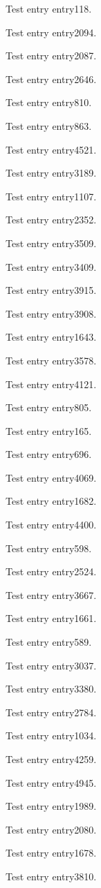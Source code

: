 Test entry \gls{entry118}.

Test entry \gls{entry2094}.

Test entry \gls{entry2087}.

Test entry \gls{entry2646}.

Test entry \gls{entry810}.

Test entry \gls{entry863}.

Test entry \gls{entry4521}.

Test entry \gls{entry3189}.

Test entry \gls{entry1107}.

Test entry \gls{entry2352}.

Test entry \gls{entry3509}.

Test entry \gls{entry3409}.

Test entry \gls{entry3915}.

Test entry \gls{entry3908}.

Test entry \gls{entry1643}.

Test entry \gls{entry3578}.

Test entry \gls{entry4121}.

Test entry \gls{entry805}.

Test entry \gls{entry165}.

Test entry \gls{entry696}.

Test entry \gls{entry4069}.

Test entry \gls{entry1682}.

Test entry \gls{entry4400}.

Test entry \gls{entry598}.

Test entry \gls{entry2524}.

Test entry \gls{entry3667}.

Test entry \gls{entry1661}.

Test entry \gls{entry589}.

Test entry \gls{entry3037}.

Test entry \gls{entry3380}.

Test entry \gls{entry2784}.

Test entry \gls{entry1034}.

Test entry \gls{entry4259}.

Test entry \gls{entry4945}.

Test entry \gls{entry1989}.

Test entry \gls{entry2080}.

Test entry \gls{entry1678}.

Test entry \gls{entry3810}.

